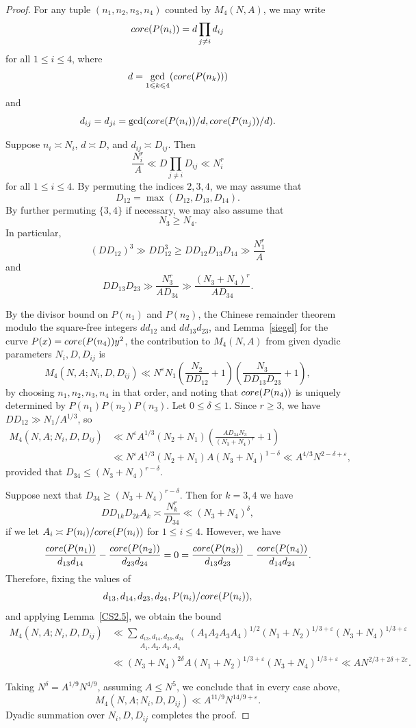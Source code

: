 \documentclass[10pt,a4paper]{amsart}
\newcommand{\co}{\textnormal{core}}
\renewcommand{\ge}{\geqslant}
\renewcommand{\le}{\leqslant}
\begin{document}
\begin{proof}
For any tuple $(n_1,n_2,n_3,n_4)$ counted by $M_4(N,A)$, we may write
$$\co(P(n_i)) = d \prod_{j\ne i} d_{ij}$$
for all $1\le i\le 4$,
where $$d = \gcd_{1\le k\le 4}(\co(P(n_k)))$$
and $$d_{ij} = d_{ji} = \gcd(\co(P(n_i))/d, \co(P(n_j))/d).$$

Suppose $n_i\asymp N_i$, $d\asymp D$, and $d_{ij}\asymp D_{ij}$.
Then $$\frac{N_i^r}{A} \ll D \prod_{j\ne i} D_{ij} \ll N_i^r$$
for all $1\le i\le 4$.
By permuting the indices $2,3,4$, we may assume that
$$D_{12} = \max(D_{12},D_{13},D_{14}).$$
By further permuting $\{3,4\}$ if necessary, we may also assume that
$$N_3 \ge N_4.$$
In particular,
$$(D D_{12})^3
\gg D D_{12}^3
\ge D D_{12} D_{13} D_{14} \gg \frac{N_1^r}{A}$$
and
$$DD_{13}D_{23} \gg \frac{N_3^r}{A D_{34}}
\gg \frac{(N_3+N_4)^r}{A D_{34}}.$$


By the divisor bound
on $P(n_1)$ and $P(n_2)$,
the Chinese remainder theorem modulo the square-free integers
$dd_{12}$ and $dd_{13}d_{23}$,
and Lemma~\ref{siegel} for the curve
$P(x) = \co(P(n_4)) y^2$,
the contribution to $M_4(N,A)$ from given dyadic parameters $N_i,D,D_{ij}$ is
$$M_4(N,A;N_i,D,D_{ij})
\ll N^\varepsilon N_1
\left(\frac{N_2}{DD_{12}} + 1\right)
\left(\frac{N_3}{DD_{13}D_{23}} + 1\right),$$
by choosing $n_1,n_2,n_3,n_4$ in that order,
and noting that $\co(P(n_4))$ is uniquely determined by $P(n_1)P(n_2)P(n_3)$.
Let $0\le \delta\le 1$.
Since $r\ge 3$, we have $DD_{12} \gg N_1/A^{1/3}$, so
\begin{equation*}
\begin{split}
M_4(N,A;N_i,D,D_{ij})
&\ll N^\varepsilon A^{1/3} (N_2 + N_1)
\left(\frac{AD_{34}N_3}{(N_3+N_4)^r} + 1\right) \\
&\ll N^\varepsilon A^{1/3} (N_2 + N_1)
A(N_3+N_4)^{1-\delta}
\ll A^{4/3} N^{2-\delta+\varepsilon},
\end{split}
\end{equation*}
provided that $D_{34} \le (N_3+N_4)^{r-\delta}$.

Suppose next that $D_{34} \ge (N_3+N_4)^{r-\delta}$.
Then for $k=3,4$ we have $$DD_{1k}D_{2k}A_k \asymp \frac{N_k^r}{D_{34}}
\ll (N_3+N_4)^\delta,$$
if we let $A_i \asymp P(n_i)/\co(P(n_i))$ for $1\le i\le 4$.
However, we have
$$\frac{\co(P(n_1))}{d_{13}d_{14}} - \frac{\co(P(n_2))}{d_{23}d_{24}}
= 0
= \frac{\co(P(n_3))}{d_{13}d_{23}} - \frac{\co(P(n_4))}{d_{14}d_{24}}.$$
Therefore,
fixing the values of
$$d_{13},d_{14},d_{23},d_{24},P(n_i)/\co(P(n_i)),$$
and applying Lemma~\ref{CS2.5},
we obtain the bound
\begin{equation*}
\begin{split}
M_4(N,A;N_i,D,D_{ij})
&\ll \sum_{\substack{d_{13},d_{14},d_{23},d_{24} \\
A_1,A_2,A_3,A_4}} (A_1A_2A_3A_4)^{1/2}
(N_1+N_2)^{1/3+\varepsilon} (N_3+N_4)^{1/3+\varepsilon} \\
&\ll (N_3+N_4)^{2\delta} A
(N_1+N_2)^{1/3+\varepsilon} (N_3+N_4)^{1/3+\varepsilon}
\ll A N^{2/3+2\delta+2\varepsilon}.
\end{split}
\end{equation*}

Taking $N^\delta = A^{1/9} N^{4/9}$, assuming $A\le N^5$,
we conclude that in every case above,
$$M_4(N,A;N_i,D,D_{ij}) \ll A^{11/9} N^{14/9+\varepsilon}.$$
Dyadic summation over $N_i,D,D_{ij}$ completes the proof.
\end{proof}
\end{document}
